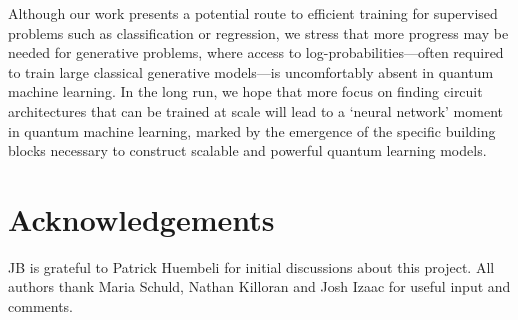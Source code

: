 \documentclass[a4paper,twocolumn,11pt]{quantumarticle}
\begin{document}

Although our work presents a potential route to efficient training for supervised problems such as classification or regression, we stress that more progress may be needed for generative problems, where access to log-probabilities---often required to train large classical generative models---is uncomfortably absent in quantum machine learning. In the long run, we hope that more focus on finding circuit architectures that can be trained at scale will lead to a `neural network' moment in quantum machine learning, marked by the emergence of the specific building blocks necessary to construct scalable and powerful quantum learning models. 

\section{Acknowledgements}
JB is grateful to Patrick Huembeli for initial discussions about this project. All authors thank Maria Schuld, Nathan Killoran and Josh Izaac for useful input and comments.






\appendix
\end{document}
